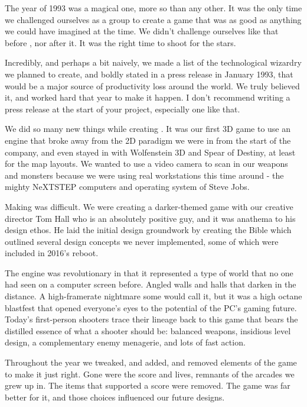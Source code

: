 The year of 1993 was a magical one, more so than any other. It was the only time we challenged ourselves as a group to create a game that was as good as anything we could have imagined at the time. We didn't challenge ourselves like that before \doom{}, nor after it. It was the right time to shoot for the stars.\\
\par
Incredibly, and perhaps a bit naively, we made a list of the technological wizardry we planned to create, and boldly stated in a press release in January 1993, that \doom{} would be a major source of productivity loss around the world. We truly believed it, and worked hard that year to make it happen. I don't recommend writing a press release at the start of your project, especially one like that.\\
\par
We did so many new things while creating \doom{}. It was our first 3D game to use an engine that broke away from the 2D paradigm we were in from the start of the company, and even stayed in with Wolfenstein 3D and Spear of Destiny, at least for the map layouts. We wanted to use a video camera to scan in our weapons and monsters because we were using real workstations this time around - the mighty NeXTSTEP computers and operating system of Steve Jobs.\\
\par
Making \doom{} was difficult. We were creating a darker-themed game with our creative director Tom Hall who is an absolutely positive guy, and it was anathema to his design ethos. He laid the initial design groundwork by creating the \doom{} Bible which outlined several design concepts we never implemented, some of which were included in 2016's reboot.\\
\par
The engine was revolutionary in that it represented a type of world that no one had seen on a computer screen before. Angled walls and halls that darken in the distance. A high-framerate nightmare some would call it, but it was a high octane blastfest that opened everyone's eyes to the potential of the PC's gaming future. Today's first-person shooters trace their lineage back to this game that bears the distilled essence of what a shooter should be: balanced weapons, insidious level design, a complementary enemy menagerie, and lots of fast action.\\
\par
Throughout the year we tweaked, and added, and removed elements of the game to make it just right. Gone were the score and lives, remnants of the arcades we grew up in. The items that supported a score were removed. The game was far better for it, and those choices influenced our future designs.\\
